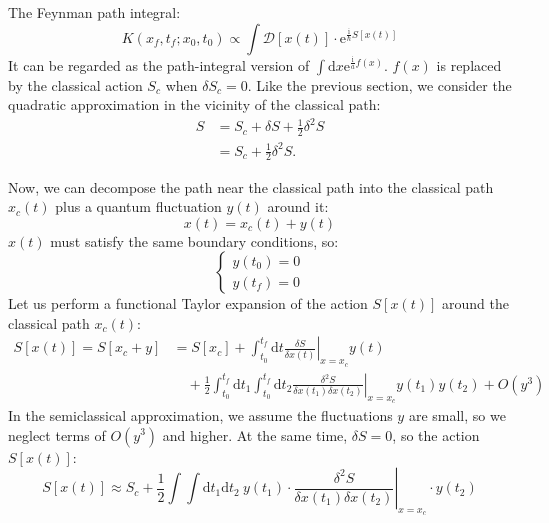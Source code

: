 The Feynman path integral:
\begin{equation}
K(x_f, t_f; x_0, t_0) \propto \int \mathcal{D}[x(t)] \cdot \mathrm{e}^{\frac{\mathrm{i}}{\hbar}S[x(t)]}
\end{equation}
It can be regarded as the path-integral version of $\int \mathrm{d}x \mathrm{e}^{\frac{\mathrm{i}}{a}f(x)}$.
$f(x)$ is replaced by the classical action $S_c$ when $\delta S_c=0$.
Like the previous section, we consider the quadratic approximation in the vicinity of the classical path:
\begin{equation}
\begin{aligned}
S &= S_c + \delta S + \frac{1}{2} \delta^2 S \\
&= S_c + \frac{1}{2} \delta^2 S.
\end{aligned}
\end{equation}

Now, we can decompose the path near the classical path into the classical path $x_c(t)$ plus a quantum fluctuation $y(t)$ around it:
\begin{equation}
x(t) = x_c(t) + y(t)
\end{equation}
$x(t)$ must satisfy the same boundary conditions, so:
\begin{equation}
\begin{cases}
y(t_0) = 0 \\
y(t_f) = 0
\end{cases}
\end{equation}
Let us perform a functional Taylor expansion of the action $S[x(t)]$ around the classical path $x_c(t)$:
\begin{equation}
\begin{aligned}
S[x(t)] = S[x_c+y] &= S[x_c] + \int_{t_0}^{t_f} \mathrm{d}t \left.\frac{\delta S}{\delta x(t)}\right|_{x=x_c} y(t) \\
&\quad + \frac{1}{2} \int_{t_0}^{t_f} \mathrm{d}t_1 \int_{t_0}^{t_f} \mathrm{d}t_2 \left.\frac{\delta^2 S}{\delta x(t_1) \delta x(t_2)}\right|_{x=x_c} y(t_1) y(t_2) + O(y^3)
\end{aligned}
\end{equation}
In the semiclassical approximation, we assume the fluctuations $y$ are small, so we neglect terms of $O(y^3)$ and higher. At the same time, $\delta S=0$, so the action $S[x(t)]$:
\begin{equation}
S[x(t)] \approx S_c + \frac{1}{2} \int \int \mathrm{d}t_1 \mathrm{d}t_2 \ y(t_1) \cdot \left.\frac{\delta^2 S}{\delta x(t_1) \delta x(t_2)}\right|_{x=x_c} \cdot y(t_2)
\end{equation}

